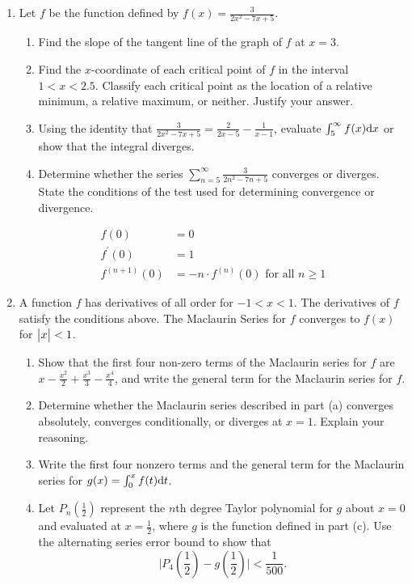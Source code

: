 \begin{enumerate}
	\item Let $f$ be the function defined by $f(x) = \frac{3}{2x^2-7x+5}$.
		\begin{enumerate}
			\item Find the slope of the tangent line of the graph of $f$ at $x=3$.
			\item Find the $x$-coordinate of each critical point of $f$ in the interval $1 < x < 2.5$.
				Classify each critical point as the location of a relative minimum, a relative maximum, or neither.
				Justify your answer.
			\item Using the identity that $\frac{3}{2x^2-7x+5} = \frac{2}{2x-5} - \frac{1}{x-1}$, evaluate $\int_{5}^{\infty}{f(x)\mathrm{d} x}$ or show that the integral diverges.
			\item Determine whether the series $\sum_{n=5}^{\infty}{\frac{3}{2n^2-7n+5}}$ converges or diverges.
				State the conditions of the test used for determining convergence or divergence.
		\end{enumerate}
	
	\begin{align*}
		f(0) &= 0 \\
		f^\prime(0) &= 1 \\
		f^{(n+1)}(0) &= -n\cdot f^{(n)}(0) \text{ for all } n \geq 1
	\end{align*}
	
	\item A function $f$ has derivatives of all order for $-1 < x < 1$.
		The derivatives of $f$ satisfy the conditions above.
		The Maclaurin Series for $f$ converges to $f(x)$ for $\big\lvert x \big\rvert < 1$.
		\begin{enumerate}
			\item Show that the first four non-zero terms of the Maclaurin series for $f$ are $x - \frac{x^2}{2} + \frac{x^3}{3} - \frac{x^4}{4}$, and write the general term for the Maclaurin series for $f$.
			\item Determine whether the Maclaurin series described in part (a) converges absolutely, converges conditionally, or diverges at $x=1$.
				Explain your reasoning.
			\item Write the first four nonzero terms and the general term for the Maclaurin series for $g(x) = \int_{0}^{x}{f(t)\mathrm{d} t}$.
			\item Let $P_n\left(\frac{1}{2}\right)$ represent the $n$th degree Taylor polynomial for $g$ about $x=0$ and evaluated at $x=\frac{1}{2}$, where $g$ is the function defined in part (c).
				Use the alternating series error bound to show that
				\begin{equation*}
					\biggr\lvert P_4\left(\frac{1}{2}\right) - g\left(\frac{1}{2}\right) \biggr\rvert < \frac{1}{500}.
				\end{equation*}
		\end{enumerate}
	
\end{enumerate}